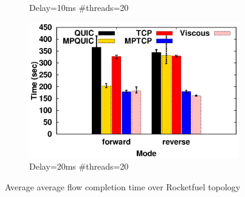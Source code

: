 \begin{figure}[h]
\begin{center}
\begin{subfigure}{.49\linewidth}
			\caption{\label{fig:rocketfuel_time_10_20}Delay=10ms \#threads=20}
		\end{subfigure}
		\begin{subfigure}{.49\linewidth}
			\includegraphics[width=0.95\linewidth]{img/rocketfuel/tymdiff-20-20.eps}
			\caption{\label{fig:rocketfuel_time_20_20}Delay=20ms \#threads=20}
		\end{subfigure}
		\caption{\label{fig:rocketfuel_time}Average average flow completion time over Rocketfuel topology}
	\end{center}
\end{figure}


